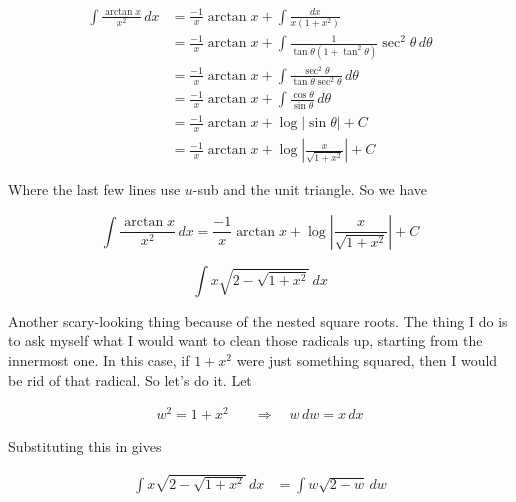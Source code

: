 \documentclass[12pt, letterpaper]{article}
\begin{document}
\begin{equation*}
\begin{aligned}
\int \frac{\arctan{x}}{{x^2}} \, dx
  &= \frac{-1}{x}\arctan{x} + \int \frac{dx}{x(1 + x^2)} \\[0.2in]
  &= \frac{-1}{x}\arctan{x} + \int \frac{1}{\tan{\theta}(1 + \tan^2{\theta})} \sec^2{\theta} \, d\theta \\[0.2in]
  &= \frac{-1}{x}\arctan{x} + \int \frac{\sec^2{\theta}}{\tan{\theta}\sec^2{\theta}} \, d\theta \\[0.2in]
  &= \frac{-1}{x}\arctan{x} + \int \frac{\cos{\theta}}{\sin{\theta}} \, d\theta \\[0.2in]
  &= \frac{-1}{x}\arctan{x} + \log{|\sin{\theta}|} + C \\[0.2in]
  &= \frac{-1}{x}\arctan{x} + \log{\left| \frac{x}{\sqrt{1+x^2}} \right|} + C
\end{aligned}
\end{equation*}

Where the last few lines use $u$-sub and the unit triangle. So we have

\begin{equation*}
\boxed
{
\int \frac{\arctan{x}}{{x^2}} \, dx
  = \frac{-1}{x}\arctan{x} + \log{\left| \frac{x}{\sqrt{1+x^2}} \right|} + C
}
\end{equation*}



\newpage

$$ \int x \sqrt{2 - \sqrt{1 + x^2}} \, dx $$

Another scary-looking thing because of the nested square roots. The thing I do is to ask myself what I would want to clean those radicals up, starting from the innermost one. In this case, if $1 + x^2$ were just something squared, then I would be rid of that radical. So let's do it. Let

\begin{equation*}
\begin{aligned}
w^2 = 1 + x^2  \quad &\Rightarrow \quad w\, dw = x \, dx
\end{aligned}
\end{equation*}

Substituting this in gives

\begin{equation*}
\begin{aligned}
\int x \sqrt{2 - \sqrt{1 + x^2}} \, dx
  &= \int w\sqrt{2 - w} \, dw
\end{aligned}
\end{equation*}
\end{document}
